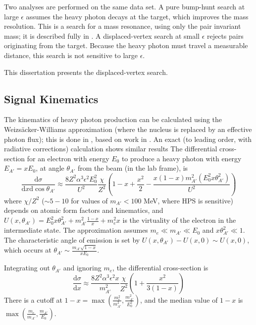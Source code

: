 Two analyses are performed on the same data set.
A pure bump-hunt search at large $\epsilon$ assumes the heavy photon decays at the target, which improves the mass resolution.
This is a search for a mass resonance, using only the pair invariant mass; it is described fully in \cite{moreno_search_2016}.
A displaced-vertex search at small $\epsilon$ rejects pairs originating from the target.
Because the heavy photon must travel a measurable distance, this search is not sensitive to large $\epsilon$.

This dissertation presents the displaced-vertex search.

\subsection{Signal Kinematics}
The kinematics of heavy photon production can be calculated using the Weizs{\"a}cker-Williams approximation (where the nucleus is replaced by an effective photon flux); this is done in \cite{bjorken_new_2009}, based on work in \cite{tsai_pair_1974,tsai_axion_1986}.
An exact (to leading order, with radiative corrections) calculation shows similar results \cite{beranek_theoretical_2013,beranek_study_2014}
The differential cross-section for an electron with energy $E_0$ to produce a heavy photon with energy $E_{A'}=xE_0$, at angle $\theta_{A'}$ from the beam (in the lab frame), is
\begin{equation}
    \frac{\mathrm{d}\sigma}{\mathrm{d}x \mathrm{d}\cos \theta_{A'}} \approx \frac{8 Z^2 \alpha^3\epsilon^2E_0^2}{U^2} \frac{\chi}{Z^2} \left( 1-x+\frac{x^2}{2} - \frac{x(1-x)m^2_{A'} (E_0^2 x \theta_{A'}^2)}{U^2} \right)
    \label{eq:cx_xtheta}
\end{equation}
where $\chi/Z^2$ ($\sim 5-10$ for values of $m_{A'}<100$ MeV, where HPS is sensitive) depends on atomic form factors and kinematics, and $U(x,\theta_{A'}) = E_0^2x\theta_{A'}^2 + m_{A'}^2\frac{1-x}{x} + m_e^2 x$ is the virtuality of the electron in the intermediate state.
The approximation assumes $m_e \ll m_{A'} \ll E_0$ and $x\theta_{A'}^2 \ll 1$.
The characteristic angle of emission is set by $U(x,\theta_{A'})-U(x,0)\sim U(x,0)$, which occurs at $\theta_{A'}\sim \frac{m_{A'}\sqrt{1-x}}{xE_0}$.

Integrating out $\theta_{A'}$ and ignoring $m_e$, the differential cross-section is
\begin{equation}
    \frac{\mathrm{d}\sigma}{\mathrm{d}x} \approx \frac{8 Z^2 \alpha^3\epsilon^2 x}{m_{A'}^2} \frac{\chi}{Z^2} \left( 1 + \frac{x^2}{3(1-x)} \right)
    \label{eq:cx_x}
\end{equation}
There is a cutoff at $1-x = \max \left(\frac{m_e^2}{m_{A'}^2},\frac{m_{A'}^2}{E_0^2} \right)$, and the median value of $1-x$ is $\max \left(\frac{m_e}{m_{A'}},\frac{m_{A'}}{E_0} \right)$.

